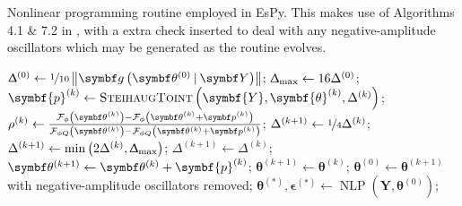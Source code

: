 \begin{algorithm}
    \caption[
        Nonlinear programming routine employed in \acs{EsPy}.
    ]
    {
        Nonlinear programming routine employed in \acs{EsPy}. This makes use of
        Algorithms 4.1 \& 7.2 in \cite{Nocedal2006}, with a extra check
        inserted to deal with any negative-amplitude oscillators which may be
        generated as the routine evolves.
    }
    \label{alg:nlp}
    \begin{algorithmic}[1]
            \State $\trustradius{0} \gets \nicefrac{1}{10} \left\lVert \bdgthzeroY \right\rVert$;
            \State $\Updelta_{\text{max}} \gets 16 \Delta^{(0)}$;
                \State $\symbf{p}^{(k)} \gets \textsc{SteihaugToint}\left(\symbf{Y}, \symbf{\theta}^{(k)}, \Delta^{(k)}\right)$;
                \State $\rho^{(k)} \gets
                    \frac
                        {\Fphithk - \Fphithkpk}
                        {\FphiQthk - \FphiQthkpk}$;
                \label{state:decrease-tr-start}
                    \State $\Delta^{(k+1)} \gets \nicefrac{1}{4} \Delta^{(k)}$;
                    \label{state:decrease-tr-end}
                \label{state:increase-tr-start}
                    \State $\Delta^{(k+1)} \gets \min\left(2 \Delta^{(k)}, \Updelta_{\text{max}}\right)$;
                    \label{state:increase-tr-end}
                \Else
                    \State $\Delta^{(k+1)} \gets \Delta^{(k)}$;
                \EndIf
                \label{state:large-rho-start}
                    \State $\bthkplusone \gets \bthk + \symbf{p}^{(k)}$;
                    \label{state:large-rho-end}
                \Else
                \label{state:small-rho-start}
                    \State $\symbf{\theta}^{(k+1)} \gets \symbf{\theta}^{(k)}$;
                    \label{state:small-rho-end}
                \EndIf
                \label{state:neg-amp-start}
                    \State $\symbf{\theta}^{(0)} \gets \symbf{\theta}^{(k+1)}$ with negative-amplitude oscillators removed;
                    \State $\symbf{\theta}^{(*)}, \symbf{\epsilon}^{(*)} \gets \operatorname{NLP}\left(\symbf{Y}, \symbf{\theta}^{(0)}\right)$;

\end{algorithmic}
\end{algorithm}

